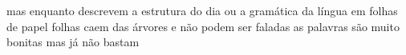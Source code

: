 \begin{poem}
\begin{stanza}
mas enquanto descrevem a\verseline
estrutura do dia ou\verseline
a gramática da língua\verseline
em folhas de papel\verseline
\qquad folhas caem\verseline
\qquad das árvores\verseline
\qquad e não podem\verseline
\qquad ser faladas\verseline
as palavras são muito bonitas\verseline
mas \quad já não bastam
\end{stanza}
\end{poem}